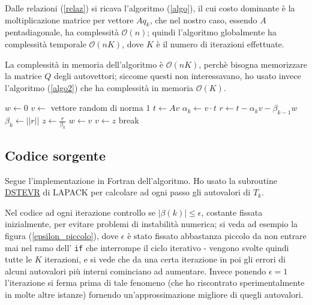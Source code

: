 \documentclass[11pt]{article}
\numberwithin{equation}{subsection}
\theoremstyle{connome}
\theoremstyle{connomesenzanumero}
\theoremstyle{connome+}
\theoremstyle{connomesenzanumero+}
\newcommand{\norm}[1]{\ensuremath{\left|\left|#1\right|\right|}}
\begin{document}
Dalle relazioni (\ref{relaz}) si ricava l'algoritmo (\ref{algo}), il cui costo dominante è la moltiplicazione matrice per vettore $A q_k$, che nel nostro caso, essendo $A$ pentadiagonale, ha complessità $\mathcal{O}(n)$; quindi l'algoritmo globalmente ha complessità temporale $\mathcal{O}(nK)$, dove $K$ è il numero di iterazioni effettuate.

La complessità in memoria dell'algoritmo è $\mathcal{O}(nK)$, perchè bisogna memorizzare la matrice $Q$ degli autovettori; siccome questi non interessavano, ho usato invece l'algoritmo (\ref{algo2}) che ha complessità in memoria $\mathcal{O}(K)$.

\begin{algorithm}[H]
\caption{}
\label{algo2}
\begin{algorithmic}
\State $w \gets 0$
\State $v \gets$ vettore random di norma $1$
\State $t \gets A v$
\State $\alpha_k \gets v \cdot t$
\State $r \gets t - \alpha_k v - \beta_{k-1}w$
\State $\beta_{k} \gets \norm{r}$
\State $z \gets \frac{r}{\beta_k}$
\State $w \gets v$
\State $v \gets z$
\Else 
\State break
\EndIf
\EndIf
\EndFor
\end{algorithmic}
\end{algorithm}

\subsection{Codice sorgente}
\label{sec-2-1}
Segue l'implementazione in Fortran dell'algoritmo. Ho usato la subroutine \href{http://www.netlib.org/lapack/explore-html/d9/d45/dstevr_8f.html#}{DSTEVR} di LAPACK per calcolare ad ogni passo gli autovalori di $T_k$. 

Nel codice ad ogni iterazione controllo se $|\beta(k)| \leq \epsilon$, costante fissata inizialmente, per evitare problemi di instabilità numerica; si veda ad esempio la figura (\ref{epsilon_piccolo}), dove $\epsilon$ è stato fissato abbastanza piccolo da non entrare mai nel ramo dell' \verb~if~ che interrompe il ciclo iterativo - vengono svolte quindi tutte le $K$ iterazioni, e si vede che da una certa iterazione in poi gli errori di alcuni autovalori più interni cominciano ad aumentare. Invece ponendo $\epsilon = 1$ l'iterazione si ferma prima di tale fenomeno (che ho riscontrato sperimentalmente in molte altre istanze) fornendo un'approssimazione migliore di quegli autovalori.
\end{document}
